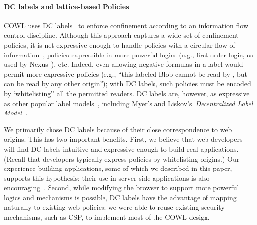 
%



\paragraph{DC labels and lattice-based Policies}
\label{sec:discussion:lattice}

COWL uses DC labels~\cite{stefan:2011:dclabels} to enforce
confinement according to an information flow control discipline.
%
Although this approach captures a wide-set of confinement policies, it
is not expressive enough to handle policies with a circular flow of
information~\cite{Badger:1995}, policies expressible in
more powerful logics (e.g., first order logic, as used by
Nexus~\cite{sirer2011logical}), etc.
%
Indeed, even allowing negative formulas in a label would permit more
expressive policies (e.g., ``this labeled Blob cannot be read by ,
but can be read by any other origin''); with DC labels, such policies must be
encoded by `whitelisting'' all the permitted readers.
%
DC labels are, however, as expressive as other popular label
models~\cite{GenLabels}, including Myer's and
Liskov's~\emph{Decentralized Label Model}~\cite{dlm}.

We primarily chose DC labels because of their close correspondence to
web origins.
%
This has two important benefits.
%
First, we believe that web developers will find DC labels intuitive
and expressive enough to build real applications.
%
(Recall that developers typically express policies by whitelisting
origins.)
%
Our experience building applications, some of which we described in this
paper, supports this hypothesis;
their use in server-side applications is also
encouraging~\cite{giffin:2012:hails, Breeze13, stoughton2014you,
stefan:2011:flexible}.
%
Second, while modifying the browser to support more powerful logics
and mechanisms is possible, DC labels have the advantage of mapping
naturally to existing web policies:
we were able to reuse existing security mechanisms, such as
CSP, to implement most of the COWL design.



